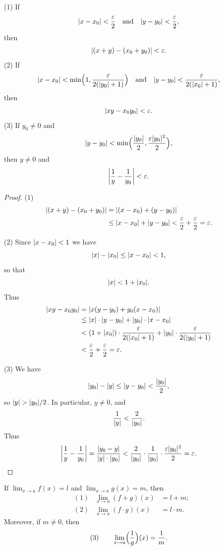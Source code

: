 \begin{spivakdefn}[LEMMA]
(1) If
\[
\abs{x-x_0}<\frac{\varepsilon}{2}\quad\text{and}\quad
\abs{y-y_0}<\frac{\varepsilon}{2},
\]
then
\[
\abs{(x+y)-(x_0+y_0)}<\varepsilon.
\]
(2) If
\[
\abs{x-x_0}<\min\Bigl(1,\frac{\varepsilon}{2(\abs{y_0}+1)}\Bigr)
\quad\text{and}\quad
\abs{y-y_0}<\frac{\varepsilon}{2(\abs{x_0}+1)},
\]
then
\[
\abs{xy-x_0 y_0}<\varepsilon.
\]
(3) If $y_0\neq 0$ and
\[
\abs{y-y_0}<\min\Bigl(\frac{\abs{y_0}}{2},\frac{\varepsilon\abs{y_0}^2}{2}\Bigr),
\]
then $y\neq 0$ and
\[
\abs*{\frac{1}{y}-\frac{1}{y_0}}<\varepsilon.
\]
\end{spivakdefn}

\begin{proof}
(1)
\begin{align*}
\abs{(x+y)-(x_0+y_0)}&=\abs{(x-x_0)+(y-y_0)}\\
&\leq\abs{x-x_0}+\abs{y-y_0}<\frac{\varepsilon}{2}+\frac{\varepsilon}{2}=\varepsilon.
\end{align*}

(2) Since $\abs{x-x_0}<1$ we have
\[
\abs{x}-\abs{x_0}\leq\abs{x-x_0}<1,
\]
so that
\[
\abs{x}<1+\abs{x_0}.
\]
Thus
\begin{align*}
\abs{xy-x_0 y_0}&=\abs{x(y-y_0)+y_0(x-x_0)}\\
&\leq\abs{x}\cdot\abs{y-y_0}+\abs{y_0}\cdot\abs{x-x_0}\\
&<(1+\abs{x_0})\cdot\frac{\varepsilon}{2(\abs{x_0}+1)}+\abs{y_0}\cdot\frac{\varepsilon}{2(\abs{y_0}+1)}\\
&<\frac{\varepsilon}{2}+\frac{\varepsilon}{2}=\varepsilon.
\end{align*}

(3) We have
\[
\abs{y_0}-\abs{y}\leq\abs{y-y_0}<\frac{\abs{y_0}}{2},
\]
so $\abs{y}>\abs{y_0}/2$. In particular, $y\neq 0$, and
\[
\frac{1}{\abs{y}}<\frac{2}{\abs{y_0}}.
\]
Thus
\[
\abs*{\frac{1}{y}-\frac{1}{y_0}}=\frac{\abs{y_0-y}}{\abs{y}\cdot\abs{y_0}}<\frac{2}{\abs{y_0}}\cdot\frac{1}{\abs{y_0}}\cdot\frac{\varepsilon\abs{y_0}^2}{2}=\varepsilon.
\]
\end{proof}

\begin{theorem}
If $\lim_{x\to a}f(x)=l$ and $\lim_{x\to a}g(x)=m$, then
\begin{align*}
&(1)& \lim_{x\to a}(f+g)(x)&=l+m;\\
&(2)& \lim_{x\to a}(f\cdot g)(x)&=l\cdot m.
\end{align*}
Moreover, if $m\neq 0$, then
\[
(3)\qquad \lim_{x\to a}\Bigl(\frac{1}{g}\Bigr)(x)=\frac{1}{m}.
\]
\end{theorem}

